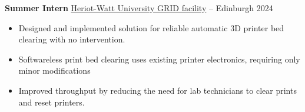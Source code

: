 \textbf{Summer Intern} \href{https://www.hw.ac.uk/uk/edinburgh/grid.htm}{Heriot-Watt University GRID facility} -- Edinburgh \hfill 2024 \\
\vspace{-6pt}
\begin{itemize}
	\item Designed and implemented solution for reliable automatic 3D printer bed clearing with no intervention.
	\item Softwareless print bed clearing uses existing printer electronics, requiring only minor modifications
	\item Improved throughput by reducing the need for lab technicians to clear prints and reset printers.
\end{itemize}

